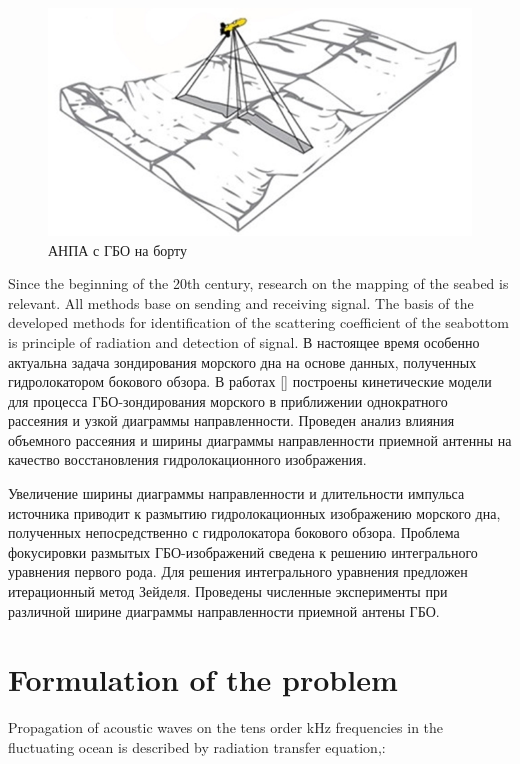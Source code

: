 \documentclass{procDDs}
\begin{document}
\begin{figure}[h!]\center
	
	\includegraphics[width=1\linewidth]{img/gbo.jpg}
	\caption{АНПА с ГБО на борту}
	\label{ris:gbo}
\end{figure}
Since the beginning of the 20th century, research on the mapping of the seabed is relevant. All methods base on sending and receiving signal. The basis of the developed methods for identification of the scattering coefficient of the seabottom is principle of radiation and detection of signal. 
В настоящее время особенно актуальна задача зондирования морского дна на основе данных, полученных  гидролокатором бокового обзора. В работах []  построены кинетические модели для процесса ГБО-зондирования морского в приближении однократного рассеяния и узкой диаграммы направленности.   Проведен  анализ влияния объемного рассеяния и ширины диаграммы направленности приемной антенны на качество восстановления гидролокационного изображения.   

Увеличение ширины диаграммы направленности и длительности импульса источника приводит к размытию гидролокационных изображению морского дна, полученных непосредственно с гидролокатора бокового обзора.
Проблема фокусировки размытых ГБО-изображений сведена к решению интегрального уравнения первого рода.
Для решения интегрального уравнения предложен итерационный метод Зейделя. Проведены численные эксперименты при различной ширине диаграммы направленности приемной антены ГБО.




\section{Formulation of the problem}
Propagation of acoustic waves on the tens order kHz frequencies in the fluctuating ocean is described by radiation
transfer equation\cite{p11},\cite{p12}:
\end{document}
